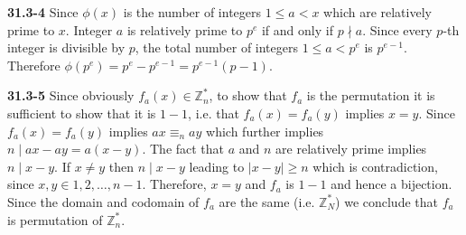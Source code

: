 \documentclass[12pt]{amsart}
\numberwithin{equation}{section}
\newcommand{\Z}{\mathbb{Z}}
\renewcommand{\(}{\left(}
\renewcommand{\)}{\right)}
\renewcommand{\[}{\left[}
\renewcommand{\]}{\right]}
\begin{document}
\bigskip

\noindent \textbf{31.3-4} Since $\phi(x)$ is the number of integers $1\leq a < x$ which are relatively prime to $x$. Integer $a$ is relatively prime to $p^e$ if and only if $p \nmid a$. Since every $p$-th integer is divisible by $p$, the total number of integers $1\leq a <p^e$ is $p^{e-1}$. Therefore $\phi(p^e)=p^e-p^{e-1}=p^{e-1}(p-1)$.

\bigskip

\noindent \textbf{31.3-5} Since obviously $f_a(x)\in \Z_n^*$, to show that $f_a$ is the permutation it is sufficient to show that it is $1-1$, i.e. that $f_a(x) = f_a(y)$ implies $x=y$. Since $f_a(x) = f_a(y)$ implies $ax \equiv_n ay$ which further implies $n\mid ax-ay=a(x-y)$. The fact that $a$ and $n$ are relatively prime implies $n\mid x-y$. If $x\neq y$ then $n\mid x-y$ leading to $|x-y|\geq n$ which is contradiction, since $x, y\in {1,2,\ldots,n-1}$. Therefore, $x=y$ and $f_a$ is $1-1$ and hence a bijection. Since the domain and codomain of $f_a$ are the same (i.e. $\Z_N^*$) we conclude that $f_a$ is permutation of $\Z_n^*$.
\end{document}

